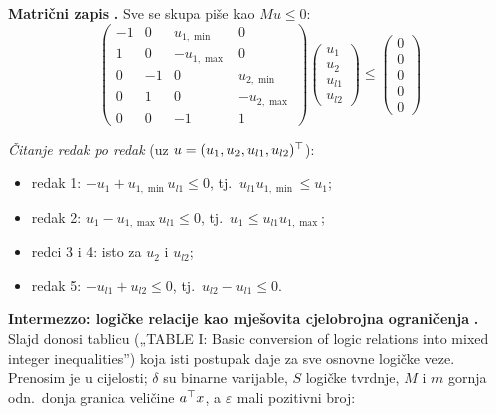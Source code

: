 \textbf{Matrični zapis} \textbf{.} Sve se skupa piše kao $Mu \le 0$:
\begin{equation}
\begin{pmatrix}
-1 & 0 & u_{1,\min} & 0 \\
 1 & 0 & -u_{1,\max} & 0 \\
 0 & -1 & 0 & u_{2,\min} \\
 0 & 1 & 0 & -u_{2,\max} \\
 0 & 0 & -1 & 1
\end{pmatrix}
\begin{pmatrix} u_1 \\ u_2 \\ u_{l1} \\ u_{l2} \end{pmatrix}
\le
\begin{pmatrix} 0 \\ 0 \\ 0 \\ 0 \\ 0 \end{pmatrix}
\end{equation}

\emph{Čitanje redak po redak} (uz $u = (u_1, u_2, u_{l1}, u_{l2})^{\top}$):
\begin{itemize}
  \item redak 1: $-u_1 + u_{1,\min}u_{l1} \le 0$, tj.\
        $u_{l1}u_{1,\min} \le u_1$;
  \item redak 2: $u_1 - u_{1,\max}u_{l1} \le 0$, tj.\
        $u_1 \le u_{l1}u_{1,\max}$;
  \item redci 3 i 4: isto za $u_2$ i $u_{l2}$;
  \item redak 5: $-u_{l1} + u_{l2} \le 0$, tj.\ $u_{l2} - u_{l1} \le 0$.
        \checkmark
\end{itemize}

\textbf{Intermezzo: logičke relacije kao mješovita cjelobrojna ograničenja}
\textbf{.} Slajd donosi tablicu („TABLE I: Basic conversion of logic
relations into mixed integer inequalities”) koja isti postupak daje za sve
osnovne logičke veze. Prenosim je u cijelosti; $\delta$ su binarne varijable,
$S$ logičke tvrdnje, $M$ i $m$ gornja odn.\ donja granica veličine $a^{\top} x$, a
$\varepsilon$ mali pozitivni broj:

